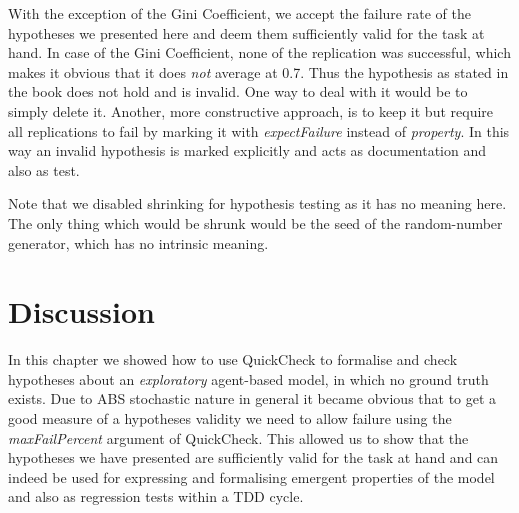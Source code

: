 With the exception of the Gini Coefficient, we accept the failure rate of the hypotheses we presented here and deem them sufficiently valid for the task at hand. In case of the Gini Coefficient, none of the replication was successful, which makes it obvious that it does \textit{not} average at 0.7. Thus the hypothesis as stated in the book does not hold and is invalid. One way to deal with it would be to simply delete it. Another, more constructive approach, is to keep it but require all replications to fail by marking it with \textit{expectFailure} instead of \textit{property}. In this way an invalid hypothesis is marked explicitly and acts as documentation and also as test.

Note that we disabled shrinking for hypothesis testing as it has no meaning here. The only thing which would be shrunk would be the seed of the random-number generator, which has no intrinsic meaning.

\section{Discussion}
In this chapter we showed how to use QuickCheck to formalise and check hypotheses about an \textit{exploratory} agent-based model, in which no ground truth exists. Due to ABS stochastic nature in general it became obvious that to get a good measure of a hypotheses validity we need to allow failure using the \textit{maxFailPercent} argument of QuickCheck. This allowed us to show that the hypotheses we have presented are sufficiently valid for the task at hand and can indeed be used for expressing and formalising emergent properties of the model and also as regression tests within a TDD cycle.